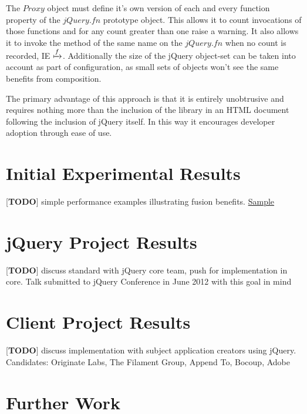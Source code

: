 \documentclass[preprint]{sigplanconf}
\begin{document}
The \begin{math}Proxy\end{math} object must define it's own version of each and every function property of the \begin{math}jQuery.fn\end{math} prototype object. This allows it to count invocations of those functions and for any count greater than one raise a warning. It also allows it to invoke the method of the same name on the \begin{math}jQuery.fn\end{math} when no count is recorded, IE \begin{math}\xmapsto{f}\end{math}. Additionally the size of the jQuery object-set can be taken into account as part of configuration, as small sets of objects won't see the same benefits from composition.

The primary advantage of this approach is that it is entirely unobtrusive and requires nothing more than the inclusion of the library in an HTML document following the inclusion of jQuery itself. In this way it encourages developer adoption through ease of use.

\section{Initial Experimental Results}

[\textbf{TODO}] simple performance examples illustrating fusion benefits. \href{http://jsperf.com/lazy-loop-fusion-vs-traditional-method-chaning/5}{Sample}

\section{jQuery Project Results}

[\textbf{TODO}] discuss standard with jQuery core team, push for implementation in core. Talk submitted to jQuery Conference in June 2012 with this goal in mind

\section{Client Project Results}

[\textbf{TODO}] discuss implementation with subject application creators using jQuery. Candidates: Originate Labs, The Filament Group, Append To, Bocoup, Adobe

\section{Further Work}
\end{document}

